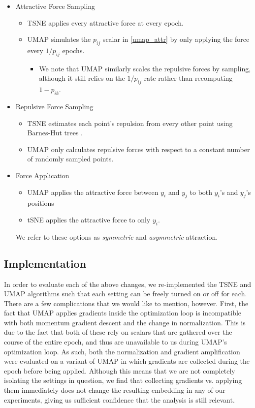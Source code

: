 \documentclass[sigconf, nonacm]{acmart}
\begin{document}
\begin{itemize}
    \item Attractive Force Sampling
        \begin{itemize}
        \item TSNE applies every attractive force at every epoch.
        \item UMAP simulates the $p_{ij}$ scalar in \ref{umap_attr} by only applying the force every $1 / p_{ij}$ epochs.
            \begin{itemize}
                \item We note that UMAP similarly scales the repulsive forces by sampling, although it still relies on the $1 / p_{ij}$ rate rather than
                    recomputing $1 - p_{ik}$.
            \end{itemize}
        \end{itemize}

    \item Repulsive Force Sampling
        \begin{itemize}
            \item TSNE estimates each point's repulsion from every other point using Barnes-Hut trees \cite{barnes1986hierarchical}.
        \item UMAP only calculates repulsive forces with respect to a constant number of randomly sampled points.
        \end{itemize}

    \item Force Application
        \begin{itemize}
        \item UMAP applies the attractive force between $y_i$ and $y_j$ to both $y_i$'s and $y_j$'s positions
        \item tSNE applies the attractive force to only $y_i$.
        \end{itemize}
        We refer to these options as \textit{symmetric} and \textit{asymmetric} attraction.

\end{itemize}

\subsection{Implementation}
In order to evaluate each of the above changes, we re-implemented the TSNE and UMAP algorithms such that each setting can be freely turned on or off for each.
There are a few complications that we would like to mention, however. First, the fact that UMAP applies gradients inside the optimization loop is incompatible
with both momentum gradient descent and the change in normalization. This is due to the fact that both of these rely on scalars that are gathered over the
course of the entire epoch, and thus are unavailable to us during UMAP's optimization loop.
As such, both the normalization and gradient amplification were evaluated on a variant of UMAP in which gradients are
collected during the epoch before being applied. Although this means that we are not completely isolating the settings in question, we find that collecting
gradients vs. applying them immediately does not change the resulting embedding in any of our experiments, giving us sufficient confidence that 
the analysis is still relevant.
\end{document}
